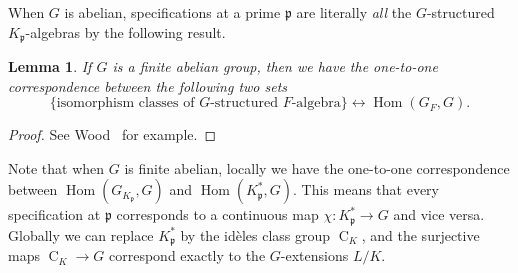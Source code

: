 \documentclass{amsart}
\numberwithin{equation}{section}
\theoremstyle{plain}
\newtheorem{lemma}[theorem]{Lemma}
\theoremstyle{definition}
\theoremstyle{remark}
\begin{document}
When $G$ is abelian, specifications at a prime $\mathfrak{p}$ are literally \emph{all} the $G$-structured $K_{\mathfrak{p}}$-algebras by the following result.
\begin{lemma}\label{lemma: Galois representation}
	If $G$ is a finite abelian group, then we have the one-to-one correspondence between the following two sets
	\begin{equation*}
		\{\text{isomorphism classes of }G\text{-structured }F\text{-algebra}\}\leftrightarrow\operatorname{Hom}(G_F,G).
	\end{equation*}
\end{lemma}
\begin{proof}		
	See Wood~\cite[Lemma 2.6]{wood2010probabilities} for example.
\end{proof}
Note that when $G$ is finite abelian, locally we have the one-to-one correspondence between $\operatorname{Hom}(G_{K_{\mathfrak{p}}},G)$ and $\operatorname{Hom}(K_{\mathfrak{p}}^*,G)$.
This means that every specification at $\mathfrak{p}$ corresponds to a continuous map $\chi:K_{\mathfrak{p}}^*\to G$ and vice versa.
Globally we can replace $K_{\mathfrak{p}}^*$ by the id{\`e}les class group $\operatorname{C}_K$, and the surjective maps $\operatorname{C}_K\to G$ correspond exactly to the $G$-extensions $L/K$.
\end{document}
